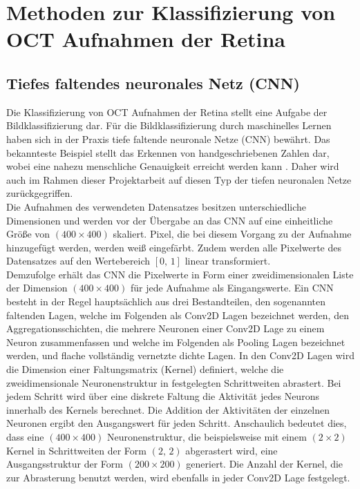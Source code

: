 \section{Methoden zur Klassifizierung von OCT Aufnahmen der Retina}
\subsection{Tiefes faltendes neuronales Netz (CNN)}
Die Klassifizierung von OCT Aufnahmen der Retina stellt eine Aufgabe der Bildklassifizierung dar. Für die Bildklassifizierung durch maschinelles Lernen haben sich in der Praxis tiefe faltende neuronale Netze (CNN) bewährt. Das bekannteste Beispiel stellt das Erkennen von handgeschriebenen Zahlen dar, wobei eine nahezu menschliche Genauigkeit erreicht werden kann \cite{MNIST}. Daher wird auch im Rahmen dieser Projektarbeit auf diesen Typ der tiefen neuronalen Netze zurückgegriffen. \\
Die Aufnahmen des verwendeten Datensatzes besitzen unterschiedliche Dimensionen und werden vor der Übergabe an das CNN auf eine einheitliche Grö{\ss}e von $(400\times 400)$ skaliert. Pixel, die bei diesem Vorgang zu der Aufnahme hinzugefügt werden, werden wei{\ss} eingefärbt. Zudem werden alle Pixelwerte des Datensatzes auf den Wertebereich $[0,\,1]$ linear transformiert. \\ 
Demzufolge erhält das CNN die Pixelwerte in Form einer zweidimensionalen Liste der Dimension $(400\times 400)$ für jede Aufnahme als Eingangswerte. Ein CNN besteht in der Regel hauptsächlich aus drei Bestandteilen, den sogenannten faltenden Lagen, welche im Folgenden als Conv2D Lagen bezeichnet werden, den Aggregationsschichten, die mehrere Neuronen einer Conv2D Lage zu einem Neuron zusammenfassen und welche im Folgenden als Pooling Lagen bezeichnet werden, und flache vollständig vernetzte dichte Lagen. In den Conv2D Lagen wird die Dimension einer Faltungsmatrix (Kernel) definiert, welche die zweidimensionale Neuronenstruktur in festgelegten Schrittweiten abrastert. Bei jedem Schritt wird über eine diskrete Faltung die Aktivität jedes Neurons innerhalb des Kernels berechnet. Die Addition der Aktivitäten der einzelnen Neuronen ergibt den Ausgangswert für jeden Schritt. Anschaulich bedeutet dies, dass eine $(400\times 400)$ Neuronenstruktur, die beispielsweise mit einem $(2 \times 2)$ Kernel in Schrittweiten der Form $(2,\,2)$ abgerastert wird, eine Ausgangsstruktur der Form $(200\times 200)$ generiert. Die Anzahl der Kernel, die zur Abrasterung benutzt werden, wird ebenfalls in jeder Conv2D Lage festgelegt.  \\
